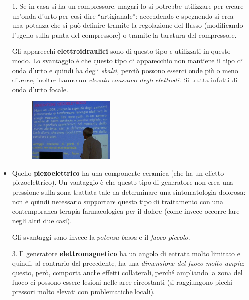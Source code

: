 \begin{itemize}
\item[1.]
  Se in casa si ha un compressore, magari lo si potrebbe utilizzare per
  creare un'onda d'urto per così dire ``artigianale'': accendendo e
  spegnendo si crea una potenza che si può definire tramite la
  regolazione del flusso (modificando l'ugello sulla punta del
  compressore) o tramite la taratura del compressore.

Gli apparecchi \textbf{elettroidraulici} sono di questo tipo e
utilizzati in questo modo. Lo svantaggio è che questo tipo di
apparecchio non mantiene il tipo di onda d'urto e quindi ha degli
\emph{sbalzi}, perciò possono esserci onde più o meno diverse; inoltre
hanno un \emph{elevato consumo degli elettrodi}. Si tratta infatti di
onda d'urto focale.

\begin{figure}[!ht]
\centering
\includegraphics[width=0.4\textwidth]{025/image5.jpeg}
\end{figure}

\item
  Quello \textbf{piezoelettrico} ha una componente ceramica (che ha un
  effetto piezoelettrico). Un vantaggio è che questo tipo di generatore
  non crea una pressione sulla zona trattata tale da determinare una
  sintomatologia dolorosa: non è quindi necessario supportare questo
  tipo di trattamento con una contemporanea terapia farmacologica per il
  dolore (come invece occorre fare negli altri due casi).

Gli svantaggi sono invece la \emph{potenza bassa} e il \emph{fuoco
piccolo}.

\item[3.]
  Il generatore \textbf{elettromagnetico} ha un angolo di entrata molto
  limitato e quindi, al contrario del precedente, ha una
  \emph{dimensione del fuoco molto ampia}: questo, però, comporta anche
  effetti collaterali, perché ampliando la zona del fuoco ci possono
  essere lesioni nelle aree circostanti (si raggiungono picchi pressori
  molto elevati con problematiche locali).
\end{itemize}

